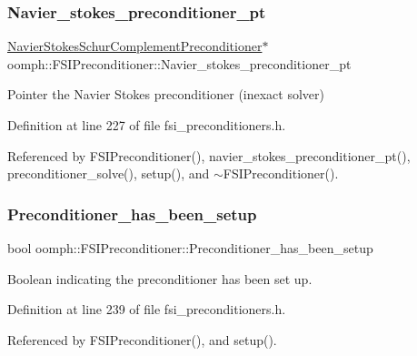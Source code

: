 \subsubsection{\texorpdfstring{Navier\+\_\+stokes\+\_\+preconditioner\+\_\+pt}{Navier\_stokes\_preconditioner\_pt}}
{\footnotesize\ttfamily \hyperlink{classoomph_1_1NavierStokesSchurComplementPreconditioner}{Navier\+Stokes\+Schur\+Complement\+Preconditioner}$\ast$ oomph\+::\+F\+S\+I\+Preconditioner\+::\+Navier\+\_\+stokes\+\_\+preconditioner\+\_\+pt\hspace{0.3cm}{\ttfamily [private]}}



Pointer the Navier Stokes preconditioner (inexact solver) 



Definition at line 227 of file fsi\+\_\+preconditioners.\+h.



Referenced by F\+S\+I\+Preconditioner(), navier\+\_\+stokes\+\_\+preconditioner\+\_\+pt(), preconditioner\+\_\+solve(), setup(), and $\sim$\+F\+S\+I\+Preconditioner().

\mbox{\label{classoomph_1_1FSIPreconditioner_ad8d4b031c62a4ec74fad432a6bf27346}} 
\subsubsection{\texorpdfstring{Preconditioner\+\_\+has\+\_\+been\+\_\+setup}{Preconditioner\_has\_been\_setup}}
{\footnotesize\ttfamily bool oomph\+::\+F\+S\+I\+Preconditioner\+::\+Preconditioner\+\_\+has\+\_\+been\+\_\+setup\hspace{0.3cm}{\ttfamily [private]}}



Boolean indicating the preconditioner has been set up. 



Definition at line 239 of file fsi\+\_\+preconditioners.\+h.



Referenced by F\+S\+I\+Preconditioner(), and setup().

\mbox{\label{classoomph_1_1FSIPreconditioner_ada9ff0aa8a1b15dea196a6d753ec740e}} 
